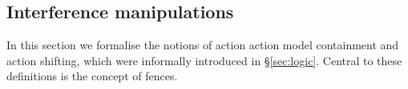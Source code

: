 %	
%
%
%
%
\subsection{Interference manipulations}\label{subsec:extension}
In this section we formalise the notions of action action model containment and action shifting, which were informally introduced in \S\ref{sec:logic}. Central to these definitions is the concept of fences.
%
